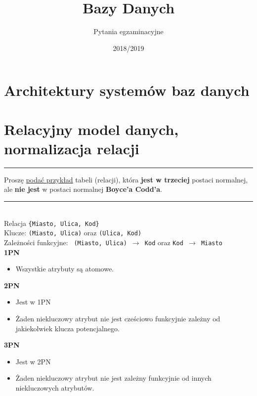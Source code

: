 \documentclass[a5paper,6pt]{article}
\title{Bazy Danych}
\author{Pytania egzaminacyjne}
\date{2018/2019}
\newcommand{\horrule}[1]{\rule{\linewidth}{#1}}
\begin{document}
    \maketitle
    \tableofcontents
    \pagebreak

    \section{Architektury systemów baz danych} %
    \label{sec:architektury_systemow}


    \section{Relacyjny model danych, normalizacja relacji} %
    \label{sec:relacyjny_model_danych_normalizacja_relacji}

    \horrule{0.5pt}
    Proszę \underline{podać przykład} tabeli (relacji), która \textbf{jest w
    trzeciej} postaci normalnej, ale \textbf{nie jest} w postaci normalnej
    \textbf{Boyce’a Codd’a}.\\
    \horrule{0.5pt}\\

    Relacja \texttt{\{Miasto, Ulica, Kod\}}\\
    Klucze: \texttt{(Miasto, Ulica)} oraz \texttt{(Ulica, Kod)}\\
    Zależności funkcyjne: \texttt{ (Miasto, Ulica) $\rightarrow$ Kod} oraz
                          \texttt{Kod $\rightarrow$ Miasto}\\

    \textbf{1PN}
    \begin{itemize}
        \item Wszystkie atrybuty są atomowe.
    \end{itemize}

    \textbf{2PN}
    \begin{itemize}
        \item Jest w 1PN
        \item Żaden niekluczowy atrybut nie jest
              cześciowo funkcyjnie zależny od jakiekolwiek klucza potencjalnego.
    \end{itemize}

    \textbf{3PN}
    \begin{itemize}
        \item Jest w 2PN
        \item Żaden niekluczowy atrybut nie jest zależny
              funkcyjnie od innych niekluczowych atrybutów.
    \end{itemize}
\end{document}

